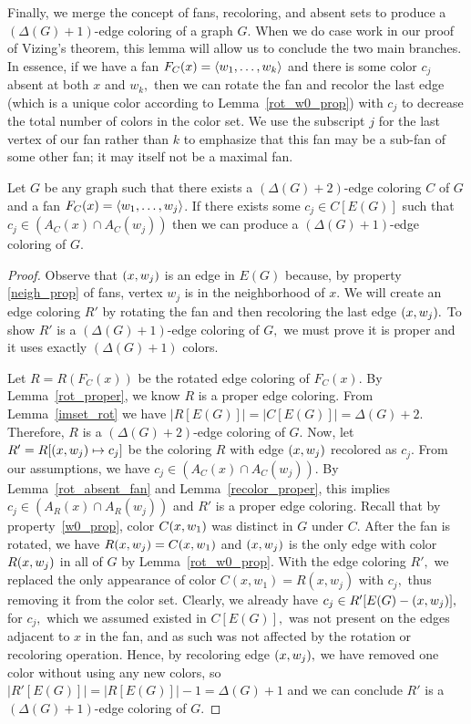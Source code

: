 Finally, we merge the concept of fans, recoloring, and absent sets to produce a $(\Delta(G)+1)$-edge coloring of a graph $G.$ When we do case work in our proof of Vizing's theorem, this lemma will allow us to conclude the two main branches. In essence, if we have a fan $F_C(x) = \langle w_1, \dots, w_k\rangle$ and there is some color $c_j$ absent at both $x$ and $w_k,$ then we can rotate the fan and recolor the last edge (which is a unique color according to Lemma~\ref{rot_w0_prop}) with $c_j$ to decrease the total number of colors in the color set. We use the subscript $j$ for the last vertex of our fan rather than $k$ to emphasize that this fan may be a sub-fan of some other fan; it may itself not be a maximal fan.
\begin{prop}\label{smaller_lemma}
    Let $G$ be any graph such that there exists a $(\Delta(G)+2)$-edge coloring $C$ of $G$ and a fan $F_{C}(x) = \langle w_1, \dots, w_j \rangle$. If there exists some $c_j \in C[E(G)]$ such that $c_j \in (A_{C}(x) \cap A_{C}(w_j))$ then we can produce a $(\Delta(G)+1)$-edge coloring of $G$.
\end{prop}
\begin{proof}
Observe that $(x, w_j)$ is an edge in $E(G)$ because, by property \ref{neigh_prop} of fans, vertex $w_j$ is in the neighborhood of $x.$ We will create an edge coloring $R'$ by rotating the fan and then recoloring the last edge $(x, w_j).$ To show $R'$ is a $(\Delta(G)+1)$-edge coloring of $G,$ we must prove it is proper and it uses exactly $(\Delta(G)+1)$ colors.

Let $R = R(F_C(x))$ be the rotated edge coloring of $F_C(x).$ By Lemma~\ref{rot_proper}, we know $R$ is a proper edge coloring. From Lemma~\ref{imset_rot} we have $|R[E(G)]| = |C[E(G)]| = \Delta(G)+2.$ Therefore, $R$ is a $(\Delta(G)+2)$-edge coloring of $G.$ Now, let $R' = R[(x, w_j) \mapsto c_j]$ be the coloring $R$ with edge $(x, w_j)$ recolored as $c_j$. From our assumptions, we have $c_j \in (A_{C}(x) \cap A_{C}(w_j)).$ By Lemma~\ref{rot_absent_fan} and Lemma~\ref{recolor_proper}, this implies $c_j \in (A_{R}(x) \cap A_{R}(w_j))$ and $R'$ is a proper edge coloring. Recall that by property~\ref{w0_prop}, color $C(x, w_1)$ was distinct in $G$ under $C$. After the fan is rotated, we have $R(x, w_j) = C(x, w_1)$ and $(x, w_j)$ is the only edge with color $R(x, w_j)$ in all of $G$ by Lemma~\ref{rot_w0_prop}. With the edge coloring $R',$ we replaced the only appearance of color $C(x, w_1) = R(x, w_j)$ with $c_j,$ thus removing it from the color set. Clearly, we already have $c_j \in R'[E(G) - (x, w_j)],$ for $c_j,$ which we assumed existed in $C[E(G)],$ was not present on the edges adjacent to $x$ in the fan, and as such was not affected by the rotation or recoloring operation. Hence, by recoloring edge $(x, w_j),$ we have removed one color without using any new colors, so $|R'[E(G)]| = |R[E(G)]| - 1 = \Delta(G) + 1$ and we can conclude $R'$ is a $(\Delta(G) + 1)$-edge coloring of $G.$
\end{proof}

